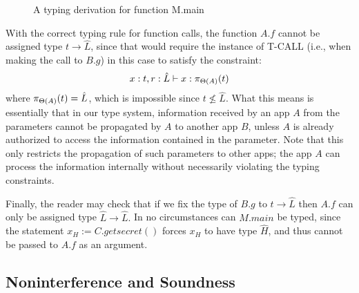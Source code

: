 {{{\begin{figure*}[ht]
\caption{A typing derivation for function M.main}
\label{fig:type2}
\end{figure*}

With the correct typing rule for function calls, the function $A.f$ cannot be assigned type
$t \rightarrow \hat{L}$, since that would require the instance of T-CALL (i.e., when making the
call to $B.g$) in this case to satisfy
the constraint:
\[
x : t, r : \hat{L} \vdash x : \app{t}{\Theta(A)}
\]
where $\app{t}{\Theta(A)} = \hat{L}$, which is impossible since $t \not \leq \hat{L}.$ What this
means is essentially that in our type system, information received by an app $A$ from the parameters
cannot be propagated by $A$ to another app $B$, unless $A$ is already authorized to access the
information contained in the parameter. Note that this only restricts the propagation of such parameters
to other apps; the app $A$ can process the information internally without necessarily violating
the typing constraints.

Finally, the reader may check that if we fix the type of $B.g$ to $t \rightarrow \hat{L}$ then
$A.f$ can only be assigned type $\hat{L} \rightarrow \hat{L}.$ In no circumstances can
$M.main$ be typed, since the statement $x_H := C.getsecret()$ forces $x_H$ to have
type $\hat{H}$, and thus cannot be passed to $A.f$ as an argument.



\subsection{Noninterference and Soundness}\label{sec:noninterference}

}}}
